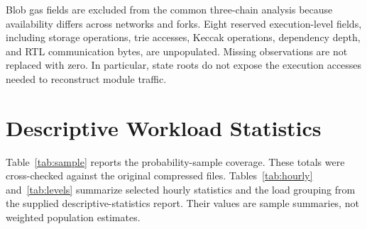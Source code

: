 \documentclass[runningheads]{llncs}
\begin{document}
Blob gas fields are excluded from the common three-chain analysis because availability differs across networks and forks. Eight reserved execution-level fields, including storage operations, trie accesses, Keccak operations, dependency depth, and RTL communication bytes, are unpopulated. Missing observations are not replaced with zero. In particular, state roots do not expose the execution accesses needed to reconstruct module traffic.

\section{Descriptive Workload Statistics}
Table~\ref{tab:sample} reports the probability-sample coverage. These totals were cross-checked against the original compressed files. Tables~\ref{tab:hourly} and~\ref{tab:levels} summarize selected hourly statistics and the load grouping from the supplied descriptive-statistics report. Their values are sample summaries, not weighted population estimates.
\end{document}
